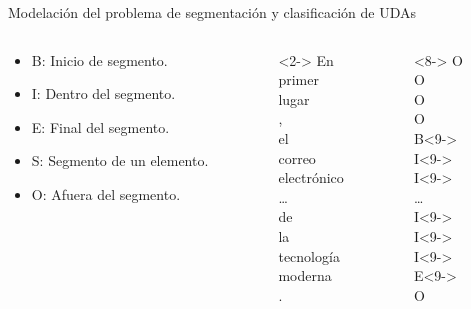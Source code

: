 \documentclass{beamer}
\begin{document}
\begin{frame}{Modelación del problema de segmentación y clasificación de UDAs}
    \begin{columns}
        \begin{column}{0.6\textwidth}
            \begin{itemize}
                \item<3-> B: Inicio de segmento.
                \item<4-> I: Dentro del segmento.
                \item<5-> E: Final del segmento.
                \item<6-> S: Segmento de un elemento.
                \item<7-> O: Afuera del segmento.
            \end{itemize}
        \end{column}
        \begin{column}{0.2\textwidth}<2->
            En\\
            primer\\
            lugar\\
            ,\\
            el\\
            correo\\
            electrónico\\
            \dots\\
            de\\
            la\\
            tecnología\\
            moderna\\
            .
        \end{column}
        \begin{column}{0.2\textwidth}<8->
            O\\
            O\\
            O\\
            O\\
            B<9->\\
            I<9->\\
            I<9->\\
            \dots\\
            I<9->\\
            I<9->\\
            I<9->\\
            E<9->\\
            O
        \end{column}
        
    \end{columns}
\end{frame}
\end{document}
